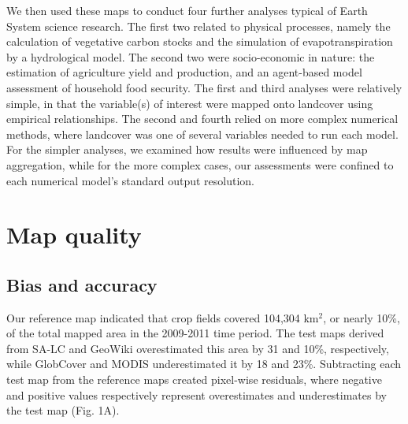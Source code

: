 \documentclass{pnastwo}
\begin{document}
\begin{article}
We then used these maps to conduct four further analyses typical of Earth System science research. The first two related to physical processes, namely the calculation of vegetative carbon stocks and the simulation of evapotranspiration by a hydrological model. The second two were socio-economic in nature: the estimation of agriculture yield and production, and an agent-based model assessment of household food security.  The first and third analyses were relatively simple, in that the variable(s) of interest were mapped onto landcover using empirical relationships. The second and fourth relied on more complex numerical methods, where landcover was one of several variables needed to run each model. For the simpler analyses, we examined how results were influenced by map aggregation, while for the more complex cases, our assessments were confined to each numerical model's standard output resolution. 

\vspace{-0.5 cm}
\section{Map quality}
\subsection{Bias and accuracy}

Our reference map indicated that crop fields covered 104,304 km$^2$, or nearly 10\%, of the total mapped area in the 2009-2011 time period. The test maps derived from SA-LC and GeoWiki overestimated this area by 31 and 10\%, respectively, while GlobCover and MODIS underestimated it by 18 and 23\%. Subtracting each test map from the reference maps created pixel-wise residuals, where negative and positive values respectively represent overestimates and underestimates by the test map (Fig. 1A).    


\end{article}
\end{document}
